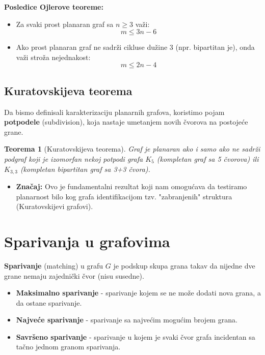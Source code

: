 \documentclass[a4paper,12pt,twoside]{report}
\newtheorem{theorem}{Teorema}[section]
\numberwithin{algorithm}{section}
\begin{document}
\textbf{Posledice Ojlerove teoreme:}
\begin{itemize}
    \item Za svaki prost planaran graf sa $n \geq 3$ važi:
    \[ m \le 3n - 6 \] 
    \item Ako prost planaran graf ne sadrži cikluse dužine 3 (npr. bipartitan je), onda važi stroža nejednakost:
    \[ m \le 2n - 4 \]
\end{itemize}

\subsection*{Kuratovskijeva teorema}
Da bismo definisali karakterizaciju planarnih grafova, koristimo pojam \textbf{potpodele} (subdivision), koja nastaje umetanjem novih čvorova na postojeće grane.



\begin{theorem}[Kuratovskijeva teorema]
    Graf je planaran ako i samo ako ne sadrži podgraf koji je izomorfan nekoj potpodi grafa $K_5$ (kompletan graf sa 5 čvorova) ili $K_{3,3}$ (kompletan bipartitan graf sa 3+3 čvora).
\end{theorem}

\begin{itemize}
    \item \textbf{Značaj:} Ovo je fundamentalni rezultat koji nam omogućava da testiramo planarnost bilo kog grafa identifikacijom tzv. "zabranjenih" struktura (Kuratovskijevi grafovi).
\end{itemize}

\section{Sparivanja u grafovima}
\textbf{Sparivanje} (matching) u grafu $G$ je podskup skupa grana takav da nijedne dve grane nemaju zajednički čvor (nisu susedne).

\begin{itemize}
    \item \textbf{Maksimalno sparivanje} - sparivanje kojem se ne može dodati nova grana, a da ostane sparivanje.
    \item \textbf{Najveće sparivanje} - sparivanje sa najvećim mogućim brojem grana.
    \item \textbf{Savršeno sparivanje} - sparivanje u kojem je svaki čvor grafa incidentan sa tačno jednom granom sparivanja.
\end{itemize}
\end{document}
